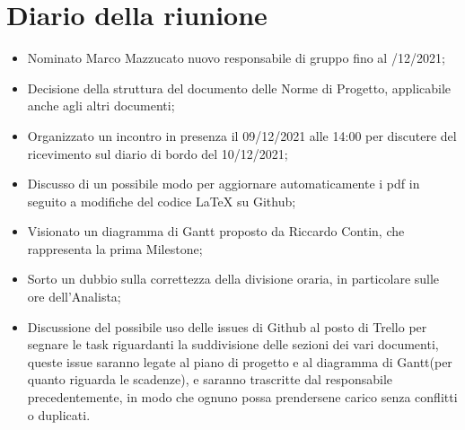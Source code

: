 \section{Diario della riunione}
\begin{itemize}
  \item Nominato Marco Mazzucato nuovo responsabile di gruppo fino al 
    /12/2021;
  \item Decisione della struttura del documento delle Norme di Progetto, applicabile anche agli altri documenti;
  \item Organizzato un incontro in presenza il 09/12/2021 alle 14:00 per discutere del ricevimento sul diario di bordo del 10/12/2021;
  \item Discusso di un possibile modo per aggiornare automaticamente i pdf in seguito a modifiche del codice LaTeX su Github;
  \item Visionato un diagramma di Gantt proposto da Riccardo Contin, che rappresenta la prima Milestone;
  \item Sorto un dubbio sulla correttezza della divisione oraria, in particolare sulle ore dell'Analista;
  \item Discussione del possibile uso delle issues di Github al posto di Trello per segnare
    le task riguardanti la suddivisione delle sezioni dei vari documenti, queste issue saranno legate
    al piano di progetto e al diagramma di Gantt(per quanto riguarda le scadenze), e saranno
    trascritte dal responsabile precedentemente, in modo che ognuno possa prendersene carico senza conflitti o duplicati.
\end{itemize}
